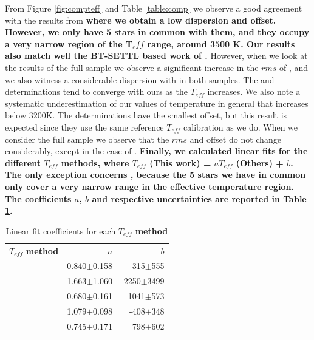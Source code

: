 \documentclass[referee]{aa}
\begin{document}
From Figure \ref{fig:compteff} and Table \ref{table:comp} we observe a good agreement with the results from \textbf{\citet{Woolf-2005} where we obtain a low dispersion and offset. However, we only have 5 stars in common with them, and they occupy a very narrow region of the T${_eff}$ range, around 3500 K. Our results also match well the BT-SETTL based work of \citet{Rajpurohit-2013a}.} However, when we look at the results of the full sample we observe a significant increase in the $rms$ of \citet{Rajpurohit-2013a}, and we also witness a considerable dispersion with \citet{Rojas-Ayala-2012} in both samples. The \citet{Onehag-2012} and \citet{Boyajian-2012} determinations tend to converge with ours as the $T_{eff}$ increases. 
We also note a systematic underestimation of our values of temperature in general that increases below 3200K. The \citet{Onehag-2012} determinations have the smallest offset, but this result is expected since they use the same reference $T_{eff}$ calibration as we do. When we consider the full sample we observe that the $rms$ and offset do not change considerably, except in the case of \citet{Rajpurohit-2013a}.
\textbf{Finally, we calculated linear fits  for the different $T_{eff}$ methods, where $T_{eff}$ (This work) = $aT_{eff}$ (Others) + $b$. The only exception concerns \citet{Woolf-2005}, because the 5 stars we have in common only cover a very narrow range in the effective temperature region. The coefficients $a$, $b$ and respective uncertainties are reported in Table \ref{table:fit_teff}.}

\begin{table}[]
\centering
\caption[]{Linear fit coefficients for each $T_{eff}$ \textbf{method}}
\label{table:fit_teff}
\begin{tabular}{l r r}
\hline
\hline
$T_{eff}$ \textbf{method} & $a$ & $b$ \\
\citet{Rojas-Ayala-2012}  &  0.840$\pm$0.158 & 315$\pm$555 \\
\citet{Onehag-2012} &  1.663$\pm$1.060 & -2250$\pm$3499 \\
\citet{Mann-2013b}  &  0.680$\pm$0.161 & 1041$\pm$573 \\
\citet{Boyajian-2012} &  1.079$\pm$0.098 & -408$\pm$348 \\
\citet{Rajpurohit-2013a}  &  0.745$\pm$0.171 & 798$\pm$602 \\
\hline
\end{tabular}
\end{table}
\end{document}
